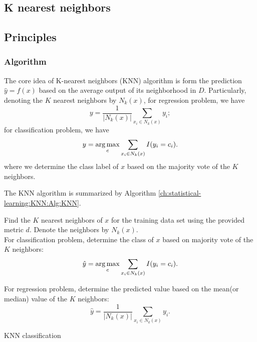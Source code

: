 \begin{refsection}
	\startcontents[chapters]	
	\chapter{K nearest neighbors}\label{ch:statistical-learning:KNN}

	\section{Principles}
	
	\subsection{Algorithm}
	
	The core idea of K-nearest neighbors (KNN) algorithm is form the prediction $\hat{y} = f(x)$ based on the average output of its neighborhood in $D$. Particularly, denoting the $K$ nearest neighbors by $N_k(x)$, for regression problem, we have
		$$y = \frac{1}{|N_k(x)|} \sum_{x_i\in N_k(x)} y_i;$$
	for classification problem, we have
		$$y = \operatorname*{arg\,max}_c \sum_{x_i\in N_k(x)} I(y_i=c_i).$$
	where we determine the class label of $x$ based on the majority vote of the $K$ neighbors.
	
	The KNN algorithm is summarized by Algorithm \autoref{ch:statistical-learning:KNN:Alg:KNN}\cite{Li2011StatisticalMethod}.
	

	
	
	\begin{algorithm}[H]\label{ch:statistical-learning:KNN:Alg:KNN}
		\SetAlgoLined
		
		Find the $K$ nearest neighbors of $x$ for the training data set using the provided metric $d$. Denote the neighbors by $N_k(x)$.\\
		
		For classification problem, determine the class of $x$ based on majority vote of the $K$ neighbors:
		$$\hat{y} = \operatorname*{arg\,max}_c \sum_{x_i\in N_k(x)} I(y_i=c_i).$$
		
		 For regression problem, determine the predicted value  based on the mean(or median) value of the $K$ neighbors:
		$$\hat{y} = \frac{1}{|N_k(x)|} \sum_{x_i\in N_k(x)} y_i.$$
	
		\caption{KNN classification}
	\end{algorithm}
	

\end{refsection}
